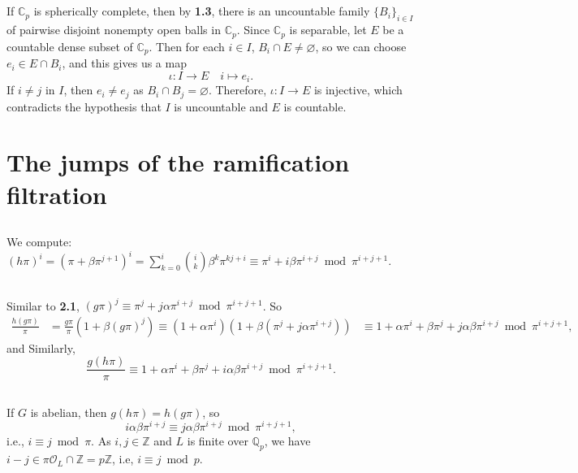 \documentclass{article}
\theoremstyle{definition}
\theoremstyle{remark}
\newcommand{\C}{\mathbb{C}}
\newcommand{\Q}{\mathbb{Q}}
\newcommand{\Z}{\mathbb{Z}}
\renewcommand{\O}{\mathcal{O}}
\begin{document}
\subsection{}
If $\C_p$ is spherically complete, then by \textbf{1.3}, there is an uncountable family $\{B_i\}_{i\in I}$ of pairwise disjoint nonempty open balls in $\C_p$.
Since $\C_p$ is separable, let $E$ be a countable dense subset of $\C_p$.
Then for each $i\in I$, $B_i\cap E\ne \varnothing$, so we can choose $e_i\in E\cap B_i$, and this gives us a map \[\iota : I\to E\quad i\mapsto e_i.\]
If $i\ne j$ in $I$, then $e_i\ne e_j$ as $B_i\cap B_j = \varnothing$.
Therefore, $\iota : I\to E$ is injective, which contradicts the hypothesis that $I$ is uncountable and $E$ is countable.

\section{The jumps of the ramification filtration}
\subsection{}
We compute:
$    (h\pi)^i = (\pi  + \beta\pi^{j+1})^i  = \sum_{k = 0}^i \binom{i}{k}\beta^k\pi^{kj + i}\equiv \pi^i + i\beta\pi^{i + j}\bmod\pi^{i+j+1}. 
$
\subsection{}
Similar to \textbf{2.1}, $(g\pi)^j\equiv \pi^j + j\alpha\pi^{i+j}\bmod \pi^{i + j +1}$.
So \begin{align*}
    \frac{h(g\pi)}{\pi} &= \frac{g\pi}{\pi}\left( 1 + \beta(g\pi)^j \right) \equiv (1 + \alpha\pi^i)(1 + \beta(\pi^j + j\alpha\pi^{i+j})) 
    &\equiv 1 + \alpha\pi^i + \beta\pi^j + j\alpha\beta\pi^{i+j}\bmod \pi^{i+j+1},
\end{align*}
and Similarly,\[\frac{g(h\pi)}{\pi}\equiv1 + \alpha\pi^i + \beta\pi^j + i\alpha\beta\pi^{i+j}\bmod \pi^{i+j+1}.\]
\subsection{}
If $G$ is abelian, then $g(h\pi) = h(g\pi)$,
so \[i\alpha\beta\pi^{i + j}\equiv j\alpha\beta\pi^{i+j}\bmod \pi^{i+j+1},\]
i.e., $i\equiv j\bmod \pi$.
As $i, j\in\Z$ and $L$ is finite over $\Q_p$, we have $i - j\in \pi\O_L\cap \Z = p\Z$, i.e, $i\equiv j\bmod p$.
\end{document}
